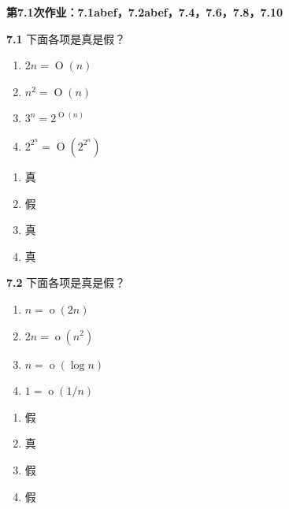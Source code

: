 \documentclass[UTF8]{report}
\newcommand{\problem}[1]{{\setlength{\parskip}{10pt}\noindent \bf{#1}}}
\newenvironment{solution}{{\noindent\hskip 2em \bf 解 \quad}}{}
\begin{document}

\maketitle



\textbf{第7.1次作业：7.1abef，7.2abef，7.4，7.6，7.8，7.10}

\problem{7.1} 下面各项是真是假？
\begin{enumerate}[label={(\alph*)}]
    \item $2n = \operatorname*{O}(n)$
    \item $n^2 = \operatorname*{O}(n)$
    \setcounter{enumi}{4}
    \item $3^n = 2^{\operatorname*{O}(n)}$
    \item $2^{2^n} = \operatorname*{O}(2^{2^n})$
\end{enumerate}

\begin{solution}
    \begin{enumerate}[label={(\alph*)}]
        \item 真
        \item 假
        \setcounter{enumi}{4}
        \item 真
        \item 真
    \end{enumerate}
\end{solution}

\problem{7.2} 下面各项是真是假？
\begin{enumerate}[label={(\alph*)}]
    \item $n = \operatorname*{o}(2n)$
    \item $2n = \operatorname*{o}(n^2)$
    \setcounter{enumi}{4}
    \item $n = \operatorname*{o}(\log n)$
    \item $1 = \operatorname*{o}(1/n)$
\end{enumerate}

\begin{solution}
    \begin{enumerate}[label={(\alph*)}]
        \item 假
        \item 真
        \setcounter{enumi}{4}
        \item 假
        \item 假
    \end{enumerate}
\end{solution}
\end{document}
